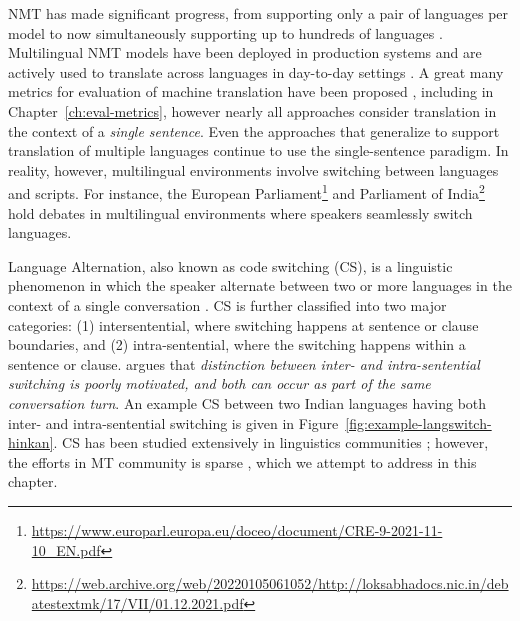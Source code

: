 NMT has made significant progress, from supporting only a pair of languages per model to now simultaneously supporting up to hundreds of languages \cite{johnson-etal-2017-googleNMT,zhang-etal-2020-multiling-nmt,tiedemann-2020-tatoeba,gowda2021-many-eng}. 
Multilingual NMT models have been deployed in production systems and are actively used to translate across languages in day-to-day settings \cite{wu-etal-2016-GNMT,turovsky-2017-googletrans,mohan-2021-ms-translator}. 
A great many metrics for evaluation of machine translation have been proposed \cite{papineni-etal-2002-bleu,doddington-2002-NIST,banerjee-lavie-2005-meteor,snover2006TER,popovic-2015-chrf,lo-2019-yisi}, including  in Chapter~\ref{ch:eval-metrics}, however nearly all approaches consider translation in the context of a \textit{single sentence}. Even the approaches that generalize to support translation of multiple languages \cite{zhang-etal-2020-multiling-nmt,tiedemann-2020-tatoeba,gowda2021-many-eng} continue to use the single-sentence paradigm. In reality, however, multilingual environments involve switching between languages and scripts.
For instance, the European Parliament\footnote{\url{https://www.europarl.europa.eu/doceo/document/CRE-9-2021-11-10_EN.pdf}}
and Parliament of India\footnote{\url{https://web.archive.org/web/20220105061052/http://loksabhadocs.nic.in/debatestextmk/17/VII/01.12.2021.pdf}} hold debates in multilingual environments where speakers seamlessly switch languages.


Language Alternation, also known as code switching (CS), is a linguistic phenomenon in which the speaker alternate between two or more languages in the context of a single conversation \cite{cms-and-ury-1977-biling}. 
CS is further classified into two major categories: (1) intersentential, where switching happens at sentence or clause boundaries, and (2) intra-sentential, where the switching happens within a sentence or clause.  
\citet{myers1989codeswitching} argues that \textit{distinction between inter- and intra-sentential switching is poorly motivated, and both can occur as part of the same conversation turn}. An example CS between two Indian languages having both inter- and intra-sentential switching is given in Figure~\ref{fig:example-langswitch-hinkan}.
CS has been studied extensively in linguistics communities \cite{nilep-2006-codeswitch}; 
however, the efforts in MT community is sparse \cite{gupta-etal-2021-training}, which we attempt to address in this chapter.

